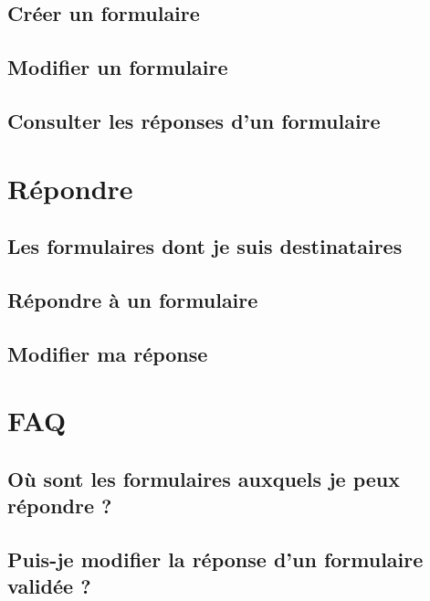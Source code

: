 \documentclass[a4paper,11pt,final]{report}
\begin{document}
\section{Créer un formulaire}
\section{Modifier un formulaire}
\section{Consulter les réponses d'un formulaire}

\chapter{Répondre}
\section{Les formulaires dont je suis destinataires}
\section{Répondre à un formulaire}
\section{Modifier ma réponse}


\chapter{FAQ}
\section{Où sont les formulaires auxquels je peux répondre ?}
\section{Puis-je modifier la réponse d'un formulaire validée ?}
\end{document}

